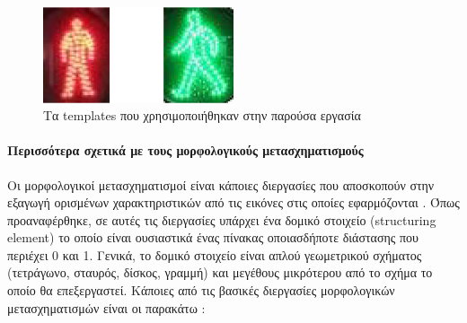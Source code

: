 \begin{figure}[H]
    \centering
    \includegraphics[width=0.5\textwidth]{images/templates.png}
    \caption{Τα templates που χρησιμοποιήθηκαν στην παρούσα εργασία}
    \label{fig:templates}
\end{figure}

\paragraph{Περισσότερα σχετικά με τους μορφολογικούς μετασχηματισμούς}
Οι μορφολογικοί μετασχηματισμοί είναι κάποιες διεργασίες που αποσκοπούν στην εξαγωγή ορισμένων χαρακτηριστικών από τις εικόνες στις οποίες εφαρμόζονται \cite{zacharia2013}. Όπως προαναφέρθηκε, σε αυτές τις διεργασίες υπάρχει ένα δομικό στοιχείο (structuring element) το οποίο είναι ουσιαστικά ένας πίνακας οποιασδήποτε διάστασης που περιέχει 0 και 1. Γενικά, το δομικό στοιχείο είναι απλού γεωμετρικού σχήματος (τετράγωνο, σταυρός, δίσκος, γραμμή) και μεγέθους μικρότερου από το σχήμα το οποίο θα επεξεργαστεί. Κάποιες από τις βασικές διεργασίες μορφολογικών μετασχηματισμών είναι οι παρακάτω \cite{OpenCVMo48:online}:
